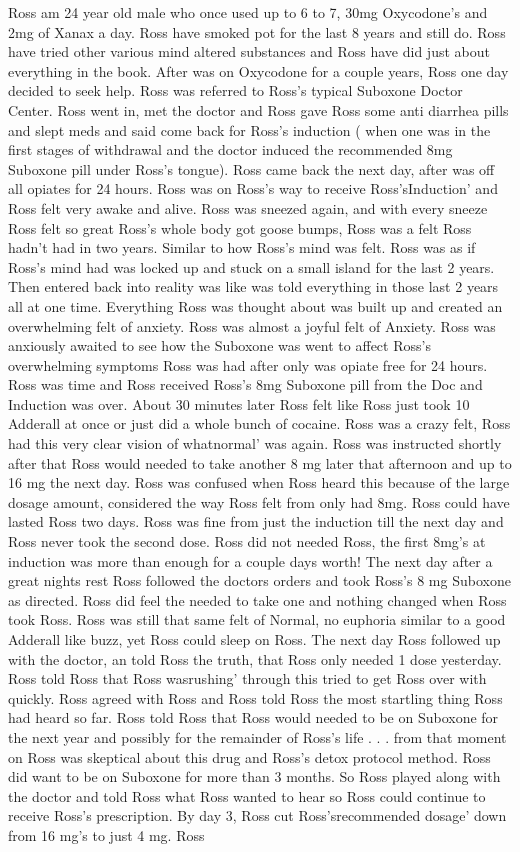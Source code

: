 \documentclass[12pt]{book}
\begin{document}
Ross am 24 year old male who once used up to 6 to 7, 30mg Oxycodone's and 2mg of Xanax a day. Ross have smoked pot for the last 8 years and still do. Ross have tried other various mind altered substances and Ross have did just about everything in the book. After was on Oxycodone for a couple years, Ross one day decided to seek help. Ross was referred to Ross's typical Suboxone Doctor Center. Ross went in, met the doctor and Ross gave Ross some anti diarrhea pills and slept meds and said come back for Ross's induction ( when one was in the first stages of withdrawal and the doctor induced the recommended 8mg Suboxone pill under Ross's tongue). Ross came back the next day, after was off all opiates for 24 hours. Ross was on Ross's way to receive Ross'sInduction' and Ross felt very awake and alive. Ross was sneezed again, and with every sneeze Ross felt so great Ross's whole body got goose bumps, Ross was a felt Ross hadn't had in two years. Similar to how Ross's mind was felt. Ross was as if Ross's mind had was locked up and stuck on a small island for the last 2 years. Then entered back into reality was like was told everything in those last 2 years all at one time. Everything Ross was thought about was built up and created an overwhelming felt of anxiety. Ross was almost a joyful felt of Anxiety. Ross was anxiously awaited to see how the Suboxone was went to affect Ross's overwhelming symptoms Ross was had after only was opiate free for 24 hours. Ross was time and Ross received Ross's 8mg Suboxone pill from the Doc and Induction was over. About 30 minutes later Ross felt like Ross just took 10 Adderall at once or just did a whole bunch of cocaine. Ross was a crazy felt, Ross had this very clear vision of whatnormal' was again. Ross was instructed shortly after that Ross would needed to take another 8 mg later that afternoon and up to 16 mg the next day. Ross was confused when Ross heard this because of the large dosage amount, considered the way Ross felt from only had 8mg. Ross could have lasted Ross two days. Ross was fine from just the induction till the next day and Ross never took the second dose. Ross did not needed Ross, the first 8mg's at induction was more than enough for a couple days worth! The next day after a great nights rest Ross followed the doctors orders and took Ross's 8 mg Suboxone as directed. Ross did feel the needed to take one and nothing changed when Ross took Ross. Ross was still that same felt of Normal, no euphoria similar to a good Adderall like buzz, yet Ross could sleep on Ross. The next day Ross followed up with the doctor, an told Ross the truth, that Ross only needed 1 dose yesterday. Ross told Ross that Ross wasrushing' through this tried to get Ross over with quickly. Ross agreed with Ross and Ross told Ross the most startling thing Ross had heard so far. Ross told Ross that Ross would needed to be on Suboxone for the next year and possibly for the remainder of Ross's life . . .  from that moment on Ross was skeptical about this drug and Ross's detox protocol method. Ross did want to be on Suboxone for more than 3 months. So Ross played along with the doctor and told Ross what Ross wanted to hear so Ross could continue to receive Ross's prescription. By day 3, Ross cut Ross'srecommended dosage' down from 16 mg's to just 4 mg. Ross 
\end{document}
